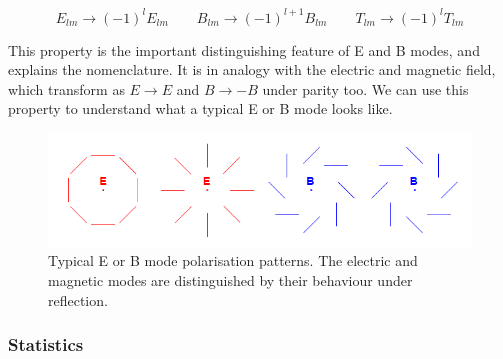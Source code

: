 \documentclass[a4paper,10pt]{article}
\begin{document}
\begin{equation}
E_{lm} \rightarrow (-1)^lE_{lm} \qquad B_{lm} \rightarrow (-1)^{l+1}B_{lm} \qquad T_{lm} \rightarrow (-1)^lT_{lm}
\end{equation} 

This property is the important distinguishing feature of E and B modes, and explains the nomenclature. It is in analogy with the electric and magnetic field, which transform as $E\rightarrow E$ and $B\rightarrow -B$ under parity too. We can use this property to understand what a typical E or B mode looks like.

\begin{figure}[h]
  \includegraphics[width=\linewidth]{EBpicture.png}
  \caption{Typical E or B mode polarisation patterns. The electric and magnetic modes are distinguished by their behaviour under reflection.}
\end{figure}

\subsubsection{Statistics}
\end{document}
